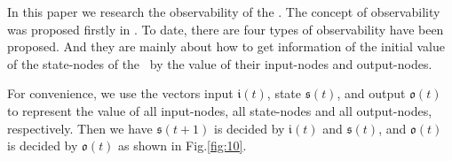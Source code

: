 In this paper we research the observability of the \BCNs. The concept of observability was proposed firstly in \cite{cheng2009controllability}. To date, there are four types of observability have been proposed. And they are mainly about how to get  information of the initial value of the state-nodes of the \BCNs\ by the value of their input-nodes and output-nodes. 

For convenience, we use the vectors input $\mathfrak{i}(t)$, state $\mathfrak{s}(t)$, and output $\mathfrak{o}(t)$ to represent the value of all input-nodes, all state-nodes and all output-nodes, respectively. Then we have $\mathfrak{s}(t+1)$ is decided by $\mathfrak{i}(t)$ and $\mathfrak{s}(t)$, and $\mathfrak{o}(t)$ is decided by $\mathfrak{o}(t)$ as shown in Fig.\ref{fig:10}.


